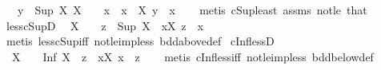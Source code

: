 \begin{isabellebody}
\ \ \ {\isachardoublequoteopen}y\ {\isacharless}{\kern0pt}\ Sup\ X{\isachardoublequoteclose}\ {\isachardoublequoteopen}X\ {\isasymnoteq}\ {\isacharbraceleft}{\kern0pt}{\isacharbraceright}{\kern0pt}{\isachardoublequoteclose}\ \ x\ \ {\isachardoublequoteopen}x\ {\isasymin}\ X{\isachardoublequoteclose}\ {\isachardoublequoteopen}y\ {\isacharless}{\kern0pt}\ x{\isachardoublequoteclose}\isanewline
%
\isadelimproof
\ \ %
\endisadelimproof
%
\isatagproof
{}\isamarkupfalse%
\ {\isacharparenleft}{\kern0pt}metis\ cSup{\isacharunderscore}{\kern0pt}least\ assms\ not{\isacharunderscore}{\kern0pt}le\ that{\isacharparenright}{\kern0pt}%
\endisatagproof
{\isafoldproof}%
%
\isadelimproof
\isanewline
%
\endisadelimproof
\isanewline
{}\isamarkupfalse%
\ less{\isacharunderscore}{\kern0pt}cSupD{\isacharcolon}{\kern0pt}\isanewline
\ \ {\isachardoublequoteopen}X\ {\isasymnoteq}\ {\isacharbraceleft}{\kern0pt}{\isacharbraceright}{\kern0pt}\ {\isasymLongrightarrow}\ z\ {\isacharless}{\kern0pt}\ Sup\ X\ {\isasymLongrightarrow}\ {\isasymexists}x{\isasymin}X{\isachardot}{\kern0pt}\ z\ {\isacharless}{\kern0pt}\ x{\isachardoublequoteclose}\isanewline
%
\isadelimproof
\ \ %
\endisadelimproof
%
\isatagproof
{}\isamarkupfalse%
\ {\isacharparenleft}{\kern0pt}metis\ less{\isacharunderscore}{\kern0pt}cSup{\isacharunderscore}{\kern0pt}iff\ not{\isacharunderscore}{\kern0pt}le{\isacharunderscore}{\kern0pt}imp{\isacharunderscore}{\kern0pt}less\ bdd{\isacharunderscore}{\kern0pt}above{\isacharunderscore}{\kern0pt}def{\isacharparenright}{\kern0pt}%
\endisatagproof
{\isafoldproof}%
%
\isadelimproof
\isanewline
%
\endisadelimproof
\isanewline
{}\isamarkupfalse%
\ cInf{\isacharunderscore}{\kern0pt}lessD{\isacharcolon}{\kern0pt}\isanewline
\ \ {\isachardoublequoteopen}X\ {\isasymnoteq}\ {\isacharbraceleft}{\kern0pt}{\isacharbraceright}{\kern0pt}\ {\isasymLongrightarrow}\ Inf\ X\ {\isacharless}{\kern0pt}\ z\ {\isasymLongrightarrow}\ {\isasymexists}x{\isasymin}X{\isachardot}{\kern0pt}\ x\ {\isacharless}{\kern0pt}\ z{\isachardoublequoteclose}\isanewline
%
\isadelimproof
\ \ %
\endisadelimproof
%
\isatagproof
{}\isamarkupfalse%
\ {\isacharparenleft}{\kern0pt}metis\ cInf{\isacharunderscore}{\kern0pt}less{\isacharunderscore}{\kern0pt}iff\ not{\isacharunderscore}{\kern0pt}le{\isacharunderscore}{\kern0pt}imp{\isacharunderscore}{\kern0pt}less\ bdd{\isacharunderscore}{\kern0pt}below{\isacharunderscore}{\kern0pt}def{\isacharparenright}{\kern0pt}%
\endisatagproof
{\isafoldproof}%
%
\isadelimproof

\end{isabellebody}

